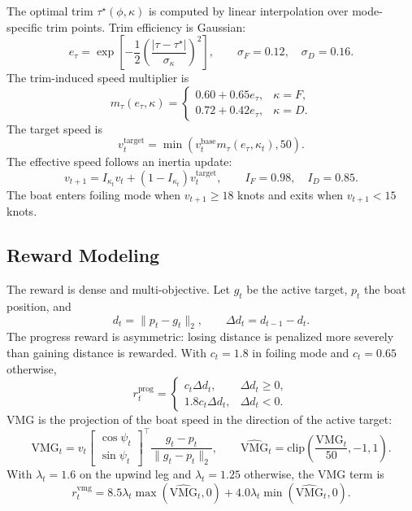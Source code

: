 \documentclass{article}
\begin{document}
The optimal trim $\tau^\star(\phi,\kappa)$ is computed by linear interpolation over mode-specific trim points. Trim efficiency is Gaussian:
\begin{equation}
    e_\tau =
    \exp\left[
        -\frac{1}{2}
        \left(
            \frac{|\tau-\tau^\star|}{\sigma_\kappa}
        \right)^2
    \right],
    \qquad
    \sigma_F=0.12,\quad \sigma_D=0.16.
\end{equation}
The trim-induced speed multiplier is
\begin{equation}
m_\tau(e_\tau,\kappa)=
\begin{cases}
0.60+0.65e_\tau, & \kappa=F,\\
0.72+0.42e_\tau, & \kappa=D.
\end{cases}
\end{equation}
The target speed is
\begin{equation}
    v^{\mathrm{target}}_t =
    \min(v^{\mathrm{base}}_t m_\tau(e_\tau,\kappa_t),50).
\end{equation}
The effective speed follows an inertia update:
\begin{equation}
    v_{t+1} =
    I_{\kappa_t}v_t + (1-I_{\kappa_t})v^{\mathrm{target}}_t,
    \qquad
    I_F=0.98,\quad I_D=0.85.
\end{equation}
The boat enters foiling mode when $v_{t+1}\ge 18$ knots and exits when $v_{t+1}<15$ knots.

\subsection{Reward Modeling}
The reward is dense and multi-objective. Let $g_t$ be the active target, $p_t$ the boat position, and
\begin{equation}
    d_t = \|p_t-g_t\|_2,\qquad
    \Delta d_t=d_{t-1}-d_t.
\end{equation}
The progress reward is asymmetric: losing distance is penalized more severely than gaining distance is rewarded. With $c_t=1.8$ in foiling mode and $c_t=0.65$ otherwise,
\begin{equation}
r^{\mathrm{prog}}_t=
\begin{cases}
c_t\Delta d_t, & \Delta d_t\ge 0,\\
1.8c_t\Delta d_t, & \Delta d_t<0.
\end{cases}
\end{equation}
VMG is the projection of the boat speed in the direction of the active target:
\begin{equation}
    \mathrm{VMG}_t =
    v_t
    \begin{bmatrix}
        \cos \psi_t\\
        \sin \psi_t
    \end{bmatrix}^{\top}
    \frac{g_t-p_t}{\|g_t-p_t\|_2},
    \qquad
    \widehat{\mathrm{VMG}}_t =
    \mathrm{clip}\left(\frac{\mathrm{VMG}_t}{50},-1,1\right).
\end{equation}
With $\lambda_t=1.6$ on the upwind leg and $\lambda_t=1.25$ otherwise, the VMG term is
\begin{equation}
    r^{\mathrm{vmg}}_t =
    8.5\lambda_t\max(\widehat{\mathrm{VMG}}_t,0)
    +4.0\lambda_t\min(\widehat{\mathrm{VMG}}_t,0).
\end{equation}
\end{document}

